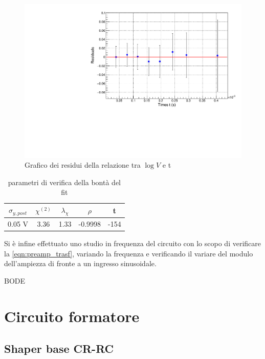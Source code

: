 \documentclass{article}
\begin{document}
\begin{center}
\begin{figure}[H]
\centering
\includegraphics[scale=0.4, angle=0]{preampRCresidui.pdf}
\caption{Grafico dei residui della relazione tra $\log V$ e t}
\label{fig:QinvsVpre}
\end{figure}
\end{center}

\begin{table}[ht]
    \centering
    \begin{tabular}{ccccc}
        \toprule
        $\sigma_{y, post}$    &$\chi^{(2)}$    &$\lambda_{\chi}$   &$\rho$ &t   \\
        \midrule
        0.05 V                &3.36            &1.33               &-0.9998&-154\\
        \bottomrule
    \end{tabular}
    \caption{parametri di verifica della bontà del fit}
\end{table}



Si è infine effettuato uno studio in frequenza del circuito con lo scopo di verificare la \ref{eqn:preamp_trasf}, variando la frequenza
e verificando il variare del modulo dell'ampiezza di fronte a un ingresso sinusoidale.

BODE

\section{Circuito formatore}
\subsection{Shaper base CR-RC}
\end{document}

